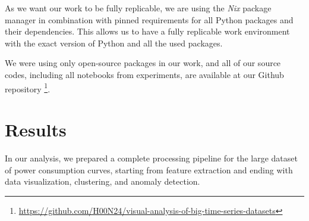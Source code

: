 As we want our work to be fully replicable, we are using the \textit{Nix} package manager \cite{exp:dolstra2008nixos} in combination with pinned requirements for all Python packages and their dependencies. This allows us to have a fully replicable work environment with the exact version of Python and all the used packages.

We were using only open-source packages in our work, and all of our source codes, including all notebooks from experiments, are available at our Github repository \footnote{\url{https://github.com/H00N24/visual-analysis-of-big-time-series-datasets}}.

\section{Results}
In our analysis, we prepared a complete processing pipeline for the large dataset of power consumption curves, starting from feature extraction and ending with data visualization, clustering, and anomaly detection.
